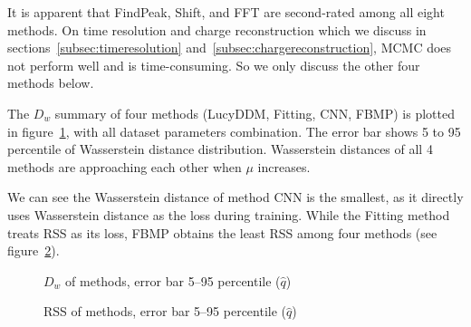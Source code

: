 It is apparent that FindPeak, Shift, and FFT are second-rated among all eight methods. On time resolution and charge reconstruction which we discuss in sections~\ref{subsec:timeresolution} and~\ref{subsec:chargereconstruction}, MCMC does not perform well and is time-consuming. So we only discuss the other four methods below. 


The $D_w$ summary of four methods (LucyDDM, Fitting, CNN, FBMP) is plotted in figure~\ref{fig:wdistsummary}, with all dataset parameters combination. The error bar shows 5 to 95 percentile of Wasserstein distance distribution. Wasserstein distances of all 4 methods are approaching each other when $\mu$ increases. 

We can see the Wasserstein distance of method CNN is the smallest, as it directly uses Wasserstein distance as the loss during training. While the Fitting method treats RSS as its loss, FBMP obtains the least RSS among four methods (see figure~\ref{fig:rsssummary}). 
\begin{figure}[H]
    \centering
    \resizebox{\textwidth}{!}{}
    \caption{\label{fig:wdistsummary} $D_w$ of methods, error bar 5--95 percentile ($\hat{q}$)}
\end{figure}

\begin{figure}[H]
    \centering
    \resizebox{\textwidth}{!}{}
    \caption{\label{fig:rsssummary} RSS of methods, error bar 5--95 percentile ($\hat{q}$)}
\end{figure}
